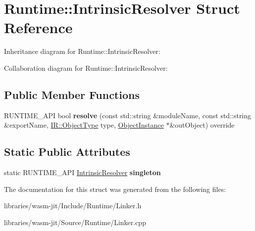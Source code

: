 \hypertarget{struct_runtime_1_1_intrinsic_resolver}{}\section{Runtime\+:\+:Intrinsic\+Resolver Struct Reference}
\label{struct_runtime_1_1_intrinsic_resolver}


Inheritance diagram for Runtime\+:\+:Intrinsic\+Resolver\+:


Collaboration diagram for Runtime\+:\+:Intrinsic\+Resolver\+:
\subsection*{Public Member Functions}
\begin{DoxyCompactItemize}
\item 
\mbox{\label{struct_runtime_1_1_intrinsic_resolver_a2a56dfa6a88e030be17a066d2907c763}} 
R\+U\+N\+T\+I\+M\+E\+\_\+\+A\+PI bool {\bfseries resolve} (const std\+::string \&module\+Name, const std\+::string \&export\+Name, \mbox{\hyperlink{struct_i_r_1_1_object_type}{I\+R\+::\+Object\+Type}} type, \mbox{\hyperlink{struct_runtime_1_1_object_instance}{Object\+Instance}} $\ast$\&out\+Object) override
\end{DoxyCompactItemize}
\subsection*{Static Public Attributes}
\begin{DoxyCompactItemize}
\item 
\mbox{\label{struct_runtime_1_1_intrinsic_resolver_aedd78257585aeb8697fae5bc08254f47}} 
static R\+U\+N\+T\+I\+M\+E\+\_\+\+A\+PI \mbox{\hyperlink{struct_runtime_1_1_intrinsic_resolver}{Intrinsic\+Resolver}} {\bfseries singleton}
\end{DoxyCompactItemize}


The documentation for this struct was generated from the following files\+:\begin{DoxyCompactItemize}
\item 
libraries/wasm-\/jit/\+Include/\+Runtime/Linker.\+h\item 
libraries/wasm-\/jit/\+Source/\+Runtime/Linker.\+cpp\end{DoxyCompactItemize}
